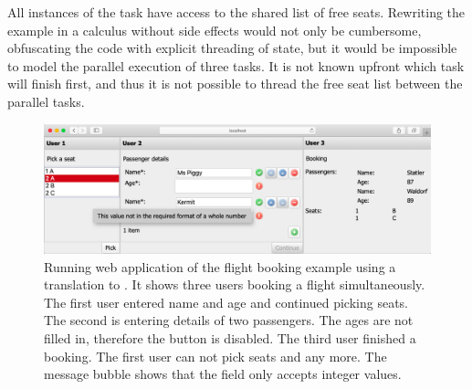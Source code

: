 \begin{example}
All instances of the  task have access to the shared list of free seats.
Rewriting the example in a calculus without side effects would not only be cumbersome,
obfuscating the code with explicit threading of state,
but it would be impossible to model the parallel execution of three  tasks.
It is not known upfront which task will finish first,
and thus it is not possible to thread the free seat list between the parallel tasks.

\end{example}



\begin{figure}[h]
  \includegraphics[width=0.6\columnwidth]{figures/flight-booking.png}
  \caption{
    Running web application of the flight booking example using a translation to \ITASKS.
    It shows three users booking a flight simultaneously.
    The first user entered name and age and continued picking seats.
    The second is entering details of two passengers.
    The ages are not filled in, therefore the  button is disabled.
    The third user finished a booking.
    The first user can not pick seats  and  any more.
    The message bubble shows that the  field only accepts integer values.
  }
  \label{fig:flight-booking}
\end{figure}
